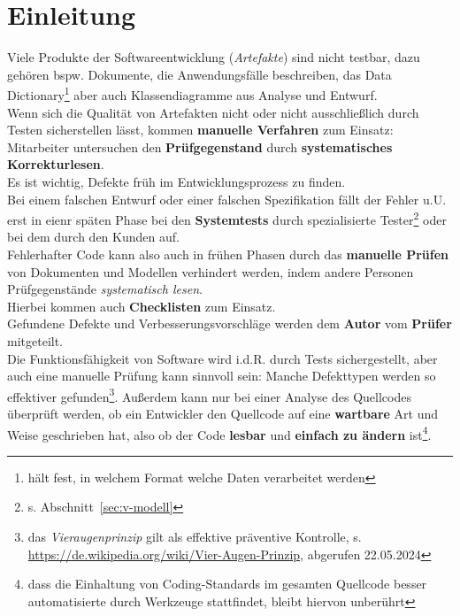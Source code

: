 \section{Einleitung}

Viele Produkte der Softwareentwicklung (\textit{Artefakte}) sind nicht testbar, dazu gehören bspw. Dokumente, die Anwendungsfälle beschreiben, das Data Dictionary\footnote{
hält fest, in welchem Format welche Daten verarbeitet werden
} aber auch Klassendiagramme aus Analyse und Entwurf.\\
Wenn sich die Qualität von Artefakten nicht oder nicht ausschließlich durch Testen sicherstellen lässt, kommen \textbf{manuelle Verfahren} zum Einsatz: Mitarbeiter untersuchen den \textbf{Prüfgegenstand} durch \textbf{systematisches Korrekturlesen}.\\

\noindent
Es ist wichtig, Defekte früh im Entwicklungsprozess zu finden.\\
Bei einem falschen Entwurf oder einer falschen Spezifikation fällt der Fehler u.U. erst in eienr späten Phase bei den \textbf{Systemtests} durch spezialisierte Tester\footnote{
s. Abschnitt~\ref{sec:v-modell}
} oder bei dem  durch den Kunden auf.\\
Fehlerhafter Code kann also auch in frühen Phasen durch das \textbf{manuelle Prüfen} von Dokumenten und Modellen verhindert werden, indem andere Personen Prüfgegenstände \textit{systematisch lesen}.\\
Hierbei kommen auch \textbf{Checklisten} zum Einsatz.\\
Gefundene Defekte und Verbesserungsvorschläge werden dem \textbf{Autor} vom \textbf{Prüfer} mitgeteilt.\\

\noindent
Die Funktionsfähigkeit von Software wird i.d.R. durch Tests sichergestellt, aber auch eine manuelle Prüfung kann sinnvoll sein: Manche Defekttypen werden so effektiver gefunden\footnote{
das \textit{Vieraugenprinzip} gilt als effektive präventive Kontrolle, s. \url{https://de.wikipedia.org/wiki/Vier-Augen-Prinzip}, abgerufen 22.05.2024
}.
Außerdem kann nur bei einer Analyse des Quellcodes überprüft werden, ob ein Entwickler den Quellcode auf eine \textbf{wartbare} Art und Weise geschrieben hat, also ob der Code \textbf{lesbar} und \textbf{einfach zu ändern} ist\footnote{
dass die Einhaltung von Coding-Standards im gesamten Quellcode besser automatisierte durch Werkzeuge stattfindet, bleibt hiervon unberührt
}.\\

